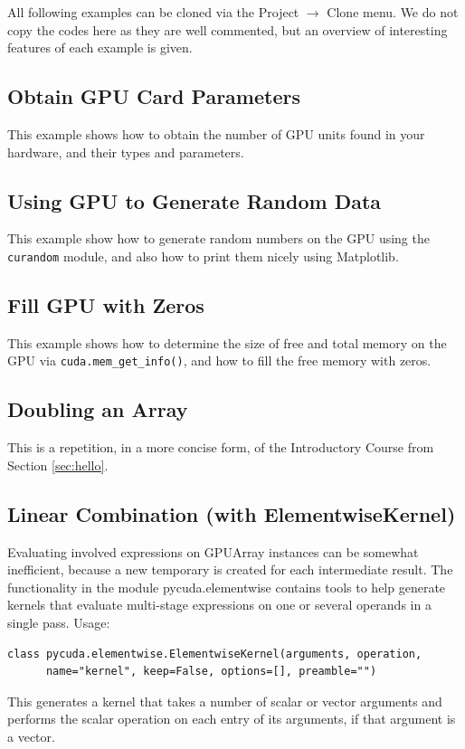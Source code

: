 \documentclass{article}
\begin{document}
All following examples can be cloned via the Project $\rightarrow$ Clone menu.
We do not copy the codes here as they are well commented, but an overview of 
interesting features of each example is given.

\subsection{Obtain GPU Card Parameters}

This example shows how to obtain the number of GPU units found in your hardware, and 
their types and parameters. 

\subsection{Using GPU to Generate Random Data}

This example show how to generate random numbers on the GPU using the {\tt curandom}
module, and also how to print them nicely using Matplotlib.

\subsection{Fill GPU with Zeros}

This example shows how to determine the size of free and total 
memory on the GPU via {\tt cuda.mem\_get\_info()}, and how to fill 
the free memory with zeros.

\subsection{Doubling an Array}

This is a repetition, in a more concise form, of the Introductory Course
from Section \ref{sec:hello}.

\subsection{Linear Combination (with ElementwiseKernel)}

Evaluating involved expressions on GPUArray instances can be somewhat inefficient, because a new temporary is created for each intermediate result. The functionality in the module pycuda.elementwise contains tools to help generate kernels that evaluate multi-stage expressions on one or several operands in a single pass. Usage:

\begin{verbatim}
class pycuda.elementwise.ElementwiseKernel(arguments, operation, 
      name="kernel", keep=False, options=[], preamble="")
\end{verbatim}
This generates a kernel that takes a number of scalar or vector arguments and performs the scalar operation on each entry of its arguments, if that argument is a vector.
\end{document}
